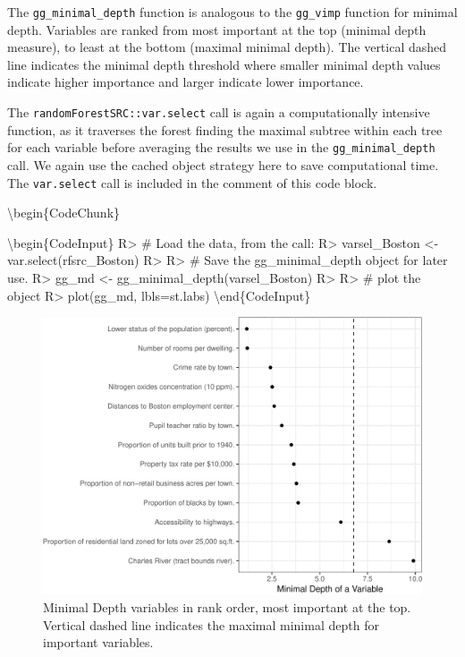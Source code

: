 \documentclass[article]{jss}
\begin{document}
The \texttt{gg\_minimal\_depth} function is analogous to the
\texttt{gg\_vimp} function for minimal depth. Variables are ranked from
most important at the top (minimal depth measure), to least at the
bottom (maximal minimal depth). The vertical dashed line indicates the
minimal depth threshold where smaller minimal depth values indicate
higher importance and larger indicate lower importance.

The \texttt{randomForestSRC::var.select} call is again a computationally
intensive function, as it traverses the forest finding the maximal
subtree within each tree for each variable before averaging the results
we use in the \texttt{gg\_minimal\_depth} call. We again use the cached
object strategy here to save computational time. The \texttt{var.select}
call is included in the comment of this code block.

\textbackslash{}begin\{CodeChunk\}

\textbackslash{}begin\{CodeInput\} R\textgreater{} \# Load the data,
from the call: R\textgreater{} varsel\_Boston \textless{}-
var.select(rfsrc\_Boston) R\textgreater{} R\textgreater{} \# Save the
gg\_minimal\_depth object for later use. R\textgreater{} gg\_md
\textless{}- gg\_minimal\_depth(varsel\_Boston) R\textgreater{}
R\textgreater{} \# plot the object R\textgreater{} plot(gg\_md,
lbls=st.labs) \textbackslash{}end\{CodeInput\}

\begin{figure}

{\centering \includegraphics{Regression-rfsrc_files/figure-latex/minimaldepth-1} 

}

\caption[Minimal Depth variables in rank order, most important at the top]{Minimal Depth variables in rank order, most important at the top. Vertical dashed line indicates the maximal minimal depth for important variables.}\label{fig:minimaldepth}
\end{figure}
\end{document}
